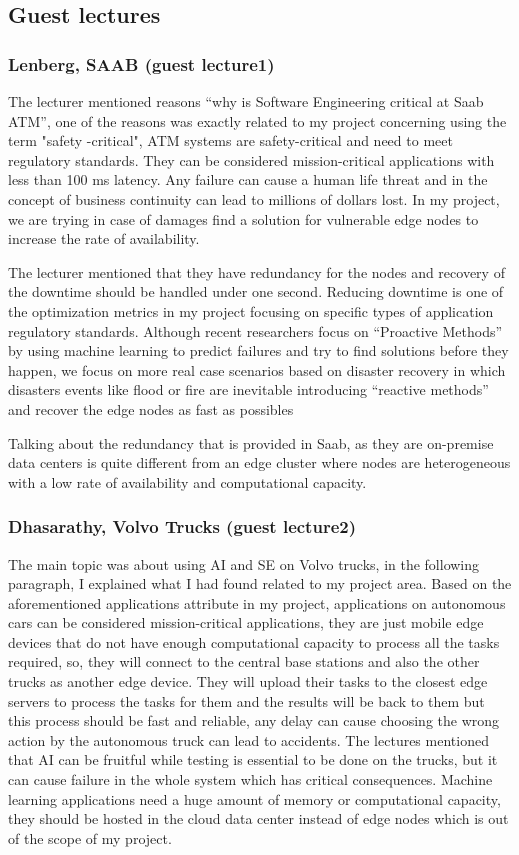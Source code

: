 \documentclass{article}
\begin{document}
\subsection{Guest lectures}
\subsubsection{Lenberg, SAAB (guest lecture1)}
The lecturer mentioned reasons ``why is Software Engineering critical at Saab ATM'',  one of the reasons was exactly related to my project concerning using the term "safety -critical", ATM systems are safety-critical and need to meet regulatory standards.  They can be considered mission-critical applications with less than 100 ms latency.  Any failure can cause a human life threat and in the concept of business continuity can lead to millions of dollars lost. In my project, we are trying in case of damages find a solution for vulnerable edge nodes to increase the rate of availability. 

The lecturer mentioned that they have redundancy for the nodes and recovery of the downtime should be handled under one second.  Reducing downtime is one of the optimization metrics in my project focusing on specific types of application regulatory standards. Although recent researchers focus on ``Proactive Methods'' by using machine learning to predict failures and try to find solutions before they happen, we focus on more real case scenarios based on disaster recovery in which disasters events like flood or fire are inevitable introducing ``reactive methods'' and recover the edge nodes as fast as possibles 

Talking about the redundancy that is provided in Saab, as they are on-premise data centers is quite different from an edge cluster where nodes are heterogeneous with a low rate of availability and computational capacity.

\subsubsection{Dhasarathy, Volvo Trucks (guest lecture2)}
The main topic was about using AI and SE on Volvo trucks, in the following paragraph, I explained what I had found related to my project area. Based on the aforementioned applications attribute in my project, applications on autonomous cars can be considered mission-critical applications, they are just mobile edge devices that do not have enough computational capacity to process all the tasks required, so, they will connect to the central base stations and also the other trucks as another edge device. They will upload their tasks to the closest edge servers to process the tasks for them and the results will be back to them but this process should be fast and reliable, any delay can cause choosing the wrong action by the autonomous truck can lead to accidents. The lectures mentioned that AI can be fruitful while testing is essential to be done on the trucks, but it can cause failure in the whole system which has critical consequences. Machine learning applications need a huge amount of memory or computational capacity, they should be hosted in the cloud data center instead of edge nodes which is out of the scope of my project.
\end{document}
